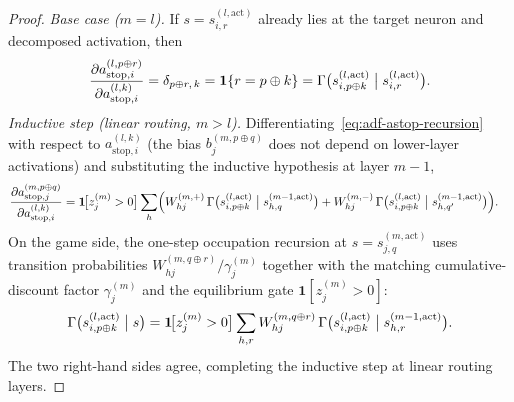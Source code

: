 \documentclass[twoside]{article}
\newcommand{\1}{\mathbf{1}}
\begin{document}
\begin{proof}
\emph{Base case ($m = l$).} If $s = s_{i,r}^{(l, \mathrm{act})}$ already lies at the target neuron
and decomposed activation, then
\begin{align}
    \frac{\partial a_{\mathrm{stop},i}^{(l, p \oplus r)}}{\partial a_{\mathrm{stop},i}^{(l, k)}}
    = \delta_{p \oplus r,\, k}
    = \1\{r = p \oplus k\}
    = \Gamma\bigl(s_{i, p \oplus k}^{(l, \mathrm{act})} \bigm| s_{i,r}^{(l, \mathrm{act})}\bigr).
\end{align}
\emph{Inductive step (linear routing, $m > l$).} Differentiating~\eqref{eq:adf-astop-recursion}
with respect to $a_{\mathrm{stop},i}^{(l, k)}$ (the bias $b_j^{(m, p \oplus q)}$ does not depend on
lower-layer activations) and substituting the inductive hypothesis at layer $m-1$,
\begin{align}
    \frac{\partial a_{\mathrm{stop},j}^{(m, p \oplus q)}}{\partial a_{\mathrm{stop},i}^{(l, k)}}
    &= \1\!\bigl[z_j^{(m)} > 0\bigr]
    \sum_h \Bigl( W_{hj}^{(m,+)}\, \Gamma\bigl(s_{i, p \oplus k}^{(l, \mathrm{act})} \bigm| s_{h,
    q}^{(m-1, \mathrm{act})}\bigr)
    + W_{hj}^{(m,-)}\, \Gamma\bigl(s_{i, p \oplus k}^{(l, \mathrm{act})} \bigm| s_{h, q'}^{(m-1,
    \mathrm{act})}\bigr) \Bigr).
\end{align}
On the game side, the one-step occupation recursion at $s = s_{j,q}^{(m, \mathrm{act})}$ uses
transition probabilities $W_{hj}^{(m, q \oplus r)} / \gamma_j^{(m)}$ together with the matching
cumulative-discount factor $\gamma_j^{(m)}$ and the equilibrium gate $\1[z_j^{(m)} > 0]$:
\begin{align}
    \Gamma\bigl(s_{i, p \oplus k}^{(l, \mathrm{act})} \bigm| s\bigr)
    = \1\!\bigl[z_j^{(m)} > 0\bigr] \sum_{h, r} W_{hj}^{(m, q \oplus r)}\, \Gamma\bigl(s_{i, p \oplus
    k}^{(l, \mathrm{act})} \bigm| s_{h, r}^{(m-1, \mathrm{act})}\bigr).
\end{align}
The two right-hand sides agree, completing the inductive step at linear routing layers.


\end{proof}
\end{document}
